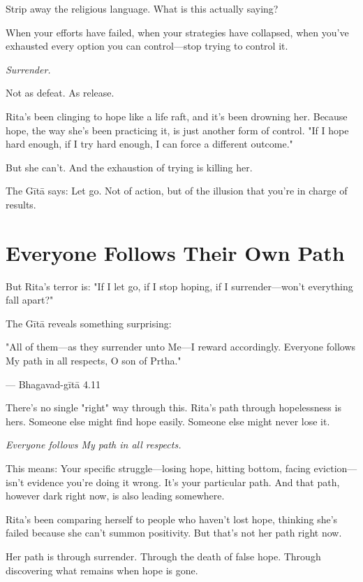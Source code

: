 \documentclass[11pt,twoside]{book}
\begin{document}
Strip away the religious language. What is this actually saying?

When your efforts have failed, when your strategies have collapsed, when you've exhausted every option you can control—stop trying to control it.

\textit{Surrender.}

Not as defeat. As release.

Rita's been clinging to hope like a life raft, and it's been drowning her. Because hope, the way she's been practicing it, is just another form of control. "If I hope hard enough, if I try hard enough, I can force a different outcome."

But she can't. And the exhaustion of trying is killing her.

The Gītā says: Let go. Not of action, but of the illusion that you're in charge of results.

\section*{Everyone Follows Their Own Path}

But Rita's terror is: "If I let go, if I stop hoping, if I surrender—won't everything fall apart?"

The Gītā reveals something surprising:

\begin{pullquote}
"All of them—as they surrender unto Me—I reward accordingly. Everyone follows My path in all respects, O son of Prtha."

--- Bhagavad-gītā 4.11
\end{pullquote}

There's no single "right" way through this. Rita's path through hopelessness is hers. Someone else might find hope easily. Someone else might never lose it.

\textit{Everyone follows My path in all respects.}

This means: Your specific struggle—losing hope, hitting bottom, facing eviction—isn't evidence you're doing it wrong. It's your particular path. And that path, however dark right now, is also leading somewhere.

Rita's been comparing herself to people who haven't lost hope, thinking she's failed because she can't summon positivity. But that's not her path right now.

Her path is through surrender. Through the death of false hope. Through discovering what remains when hope is gone.
\end{document}
